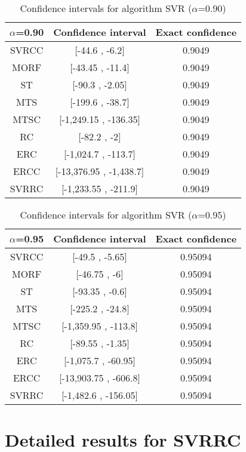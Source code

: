 \documentclass[a4paper,10pt]{article}
\begin{document}
\begin{table}[!htp]
\centering\small
\begin{tabular}{
|c|c|c|}
\hline
 $\alpha$=0.90 & Confidence interval & Exact confidence \\ \hline 
SVRCC & [-44.6 , -6.2] & 0.9049\\ \hline 
MORF & [-43.45 , -11.4] & 0.9049\\ \hline 
ST & [-90.3 , -2.05] & 0.9049\\ \hline 
MTS & [-199.6 , -38.7] & 0.9049\\ \hline 
MTSC & [-1,249.15 , -136.35] & 0.9049\\ \hline 
RC & [-82.2 , -2] & 0.9049\\ \hline 
ERC & [-1,024.7 , -113.7] & 0.9049\\ \hline 
ERCC & [-13,376.95 , -1,438.7] & 0.9049\\ \hline 
SVRRC & [-1,233.55 , -211.9] & 0.9049\\ \hline 

\end{tabular}
\caption{Confidence intervals for algorithm SVR ($\alpha$=0.90)}
\end{table}
\begin{table}[!htp]
\centering\small
\begin{tabular}{
|c|c|c|}
\hline
 $\alpha$=0.95 & Confidence interval & Exact confidence \\ \hline 
SVRCC & [-49.5 , -5.65] & 0.95094\\ \hline 
MORF & [-46.75 , -6] & 0.95094\\ \hline 
ST & [-93.35 , -0.6] & 0.95094\\ \hline 
MTS & [-225.2 , -24.8] & 0.95094\\ \hline 
MTSC & [-1,359.95 , -113.8] & 0.95094\\ \hline 
RC & [-89.55 , -1.35] & 0.95094\\ \hline 
ERC & [-1,075.7 , -60.95] & 0.95094\\ \hline 
ERCC & [-13,903.75 , -606.8] & 0.95094\\ \hline 
SVRRC & [-1,482.6 , -156.05] & 0.95094\\ \hline 

\end{tabular}
\caption{Confidence intervals for algorithm SVR ($\alpha$=0.95)}
\end{table}

 \clearpage 


\section{Detailed results for SVRRC}
\end{document}
